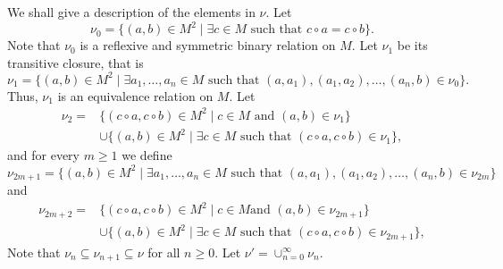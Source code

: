\documentclass[10pt]{article}
\begin{document}
We shall give  a    description of the elements in $\nu$. Let
$$\nu_0=\{ (a,b)\in M^2\mid \exists c\in M\mbox{ such that }c\circ a=c\circ b\}.$$
Note that $\nu_0$ is a reflexive and symmetric binary relation on
$M$. Let $\nu_1$ be its transitive closure, that is
$$\nu_1=\{(a,b)\in M^2\mid \exists a_1,\dots,a_n\in M \mbox{ such that }(a,a_1),(a_1,a_2),\dots ,(a_n,b)\in \nu_0\}.$$
Thus, $\nu_1$ is an equivalence relation on $M$. Let
\begin{align*}\nu_2=&\{ (c\circ a,c\circ b)\in M^2\mid c\in M\mbox{  and
	}(a,b)\in \nu_1\}\\
	&\cup \{ (a,b)\in M^2\mid \exists c\in M\mbox{ such that
	}(c\circ a,c\circ b)\in \nu_1\},
\end{align*}
and for every $m\geq 1$ we
define
$$\nu_{2m+1}=\{(a,b)\in M^2\mid \exists a_1,\dots,a_n\in M \mbox{ such that }(a,a_1),(a_1,a_2),\dots ,(a_n,b)\in \nu_{2m}\}$$
and
\begin{align*}\nu_{2m+2}=&\{ (c\circ a,c\circ b)\in M^2\mid c\in M\mbox{
		 and }(a,b)\in \nu_{2m+1}\}\\
	&\cup \{ (a,b)\in M^2\mid \exists c\in M\mbox{ such that
	}(c\circ a,c\circ b)\in \nu_{2m+1}\},\end{align*}
Note that
$\nu_n\subseteq\nu_{n+1}\subseteq \nu$ for all $n\geq 0$. Let
$\nu'=\cup_{n=0}^{\infty}\nu_n$.
\end{document}

